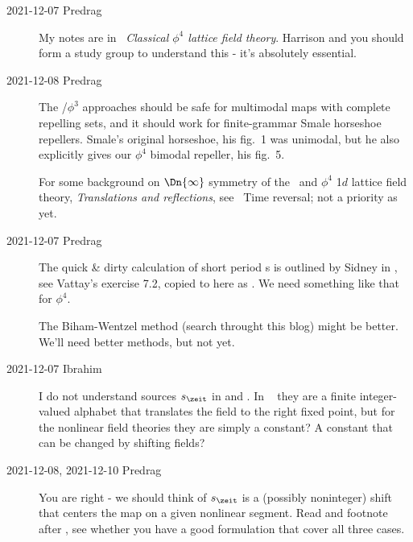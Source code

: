 \begin{description}

\item[2021-12-07 Predrag]
My notes are in
~{\em Classical {$\phi^4$} lattice field theory}.
Harrison and you should form a study group to understand this -
it's absolutely essential.


\item[2021-12-08 Predrag]
The \HenonMap/$\phi^3$ approaches should be safe for multimodal maps with
complete repelling sets, and it should work for finite-grammar Smale
horseshoe repellers.
Smale's original horseshoe, his fig.~1 was unimodal, but he
also explicitly gives our $\phi^4$ bimodal repeller, his fig.~5.

     {
For some background on $\Dn{\infty}$ symmetry of the \templatt\ and
{$\phi^4$} 1$d$ lattice field theory,  {\em
Translations and reflections}, see ~{Time reversal};
not a priority as yet.
    }

\item[2021-12-07 Predrag]
The quick \& dirty calculation of short period {\lattstate}s is outlined
by Sidney in , see Vattay's 
{exercise 7.2}, copied to here as .
We need something like that for {$\phi^4$}.

The Biham-Wentzel method  (search throught this blog)
might be better. We'll need better methods, but not yet.

\item[2021-12-07 Ibrahim]
I do not understand sources $\Ssym{\zeit}$ in  and
. In \templatt\  they are a
finite integer-valued alphabet that translates the field to the right
fixed point, but for the nonlinear field theories they are simply a
constant? A constant that can be changed by shifting fields?

\item[2021-12-08, 2021-12-10 Predrag]
You are right - we should think of $\Ssym{\zeit}$ is a (possibly
noninteger) shift that centers the map on a given nonlinear segment. Read
 and footnote after , see
whether you have a good formulation that cover all three cases.


\end{description}
